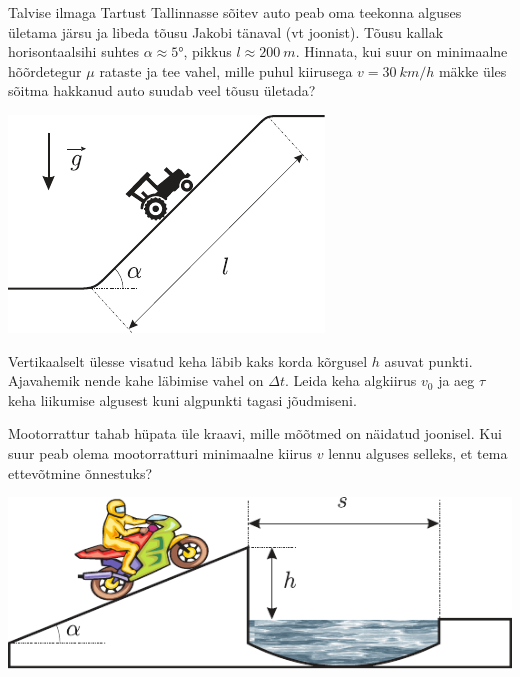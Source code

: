 \documentclass[10pt, twoside]{article}
\begin{document}
{
Talvise ilmaga Tartust Tallinnasse sõitev auto peab oma teekonna alguses ületama järsu ja libeda tõusu Jakobi tänaval (vt joonist). Tõusu kallak horisontaalsihi suhtes $\alpha \approx \ang{5}$, pikkus $l \approx \SI{200}{m}$. Hinnata, kui suur on minimaalne hõõrdetegur $\mu$ rataste ja tee vahel, mille puhul kiirusega $v = \SI{30}{km/h}$ mäkke üles sõitma hakkanud auto suudab veel tõusu ületada?

\begin{center}
	\includegraphics[width=0.5\linewidth]{2005-lahg-02-yl}
\end{center}
\probend
\bigskip


Vertikaalselt ülesse visatud keha läbib kaks korda kõrgusel $h$ asuvat punkti. Ajavahemik nende kahe läbimise vahel on $\Delta t$. Leida keha algkiirus $v_0$ ja aeg $\tau$ keha liikumise algusest kuni algpunkti tagasi jõudmiseni.
\probend
\bigskip


Mootorrattur tahab hüpata üle kraavi, mille mõõtmed on näidatud joonisel. Kui suur peab olema mootorratturi minimaalne kiirus $v$ lennu alguses selleks, et tema ettevõtmine õnnestuks?

\begin{center}
	\includegraphics[width=0.8\linewidth]{2007-lahg-05-yl}
\end{center}
\probend
\newpage

}
\end{document}
